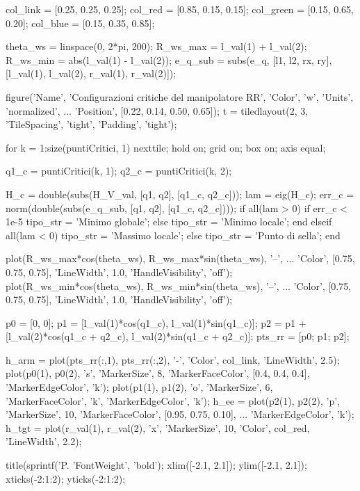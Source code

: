 \documentclass[11pt, a4paper]{article}
\begin{document}
\newpage
\begin{matlabcode}
col_link  = [0.25, 0.25, 0.25];
col_red   = [0.85, 0.15, 0.15];
col_green = [0.15, 0.65, 0.20];
col_blue  = [0.15, 0.35, 0.85];

theta_ws = linspace(0, 2*pi, 200);
R_ws_max = l_val(1) + l_val(2);
R_ws_min = abs(l_val(1) - l_val(2));
e_q_sub  = subs(e_q, [l1, l2, rx, ry], [l_val(1), l_val(2), r_val(1), r_val(2)]);

figure('Name', 'Configurazioni critiche del manipolatore RR', 'Color', 'w', 'Units', 'normalized', ...
    'Position', [0.22, 0.14, 0.50, 0.65]);
t = tiledlayout(2, 3, 'TileSpacing', 'tight', 'Padding', 'tight');

for k = 1:size(puntiCritici, 1)
    nexttile;
    hold on; grid on; box on; axis equal;

    q1_c = puntiCritici(k, 1);
    q2_c = puntiCritici(k, 2);

    H_c   = double(subs(H_V_val, [q1, q2], [q1_c, q2_c]));
    lam   = eig(H_c);
    err_c = norm(double(subs(e_q_sub, [q1, q2], [q1_c, q2_c])));
    if all(lam > 0)
        if err_c < 1e-5
            tipo_str = 'Minimo globale';
        else
            tipo_str = 'Minimo locale';
        end
    elseif all(lam < 0)
        tipo_str = 'Massimo locale';
    else
        tipo_str = 'Punto di sella';
    end

    plot(R_ws_max*cos(theta_ws), R_ws_max*sin(theta_ws), '--', ...
        'Color', [0.75, 0.75, 0.75], 'LineWidth', 1.0, 'HandleVisibility', 'off');
    plot(R_ws_min*cos(theta_ws), R_ws_min*sin(theta_ws), '--', ...
        'Color', [0.75, 0.75, 0.75], 'LineWidth', 1.0, 'HandleVisibility', 'off');

    p0 = [0, 0];
    p1 = [l_val(1)*cos(q1_c), l_val(1)*sin(q1_c)];
    p2 = p1 + [l_val(2)*cos(q1_c + q2_c), l_val(2)*sin(q1_c + q2_c)];
    pts_rr = [p0; p1; p2];

    h_arm = plot(pts_rr(:,1), pts_rr(:,2), '-', 'Color', col_link, 'LineWidth', 2.5);
    plot(p0(1), p0(2), 's', 'MarkerSize', 8, 'MarkerFaceColor', [0.4, 0.4, 0.4], 'MarkerEdgeColor', 'k');
    plot(p1(1), p1(2), 'o', 'MarkerSize', 6, 'MarkerFaceColor', 'k', 'MarkerEdgeColor', 'k');
    h_ee = plot(p2(1), p2(2), 'p', 'MarkerSize', 10, 'MarkerFaceColor', [0.95, 0.75, 0.10], ...
        'MarkerEdgeColor', 'k');
    h_tgt = plot(r_val(1), r_val(2), 'x', 'MarkerSize', 10, 'Color', col_red, 'LineWidth', 2.2);

    title(sprintf('P.%
        'FontWeight', 'bold');
    xlim([-2.1, 2.1]); ylim([-2.1, 2.1]);
    xticks(-2:1:2); yticks(-2:1:2);
\end{matlabcode}
\end{document}
